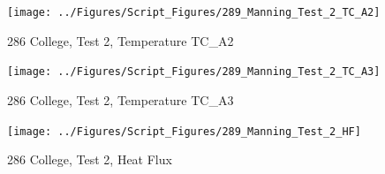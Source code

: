 \documentclass[12pt,oneside]{book}
\begin{document}
\begin{figure}[!ht]
\texttt{[image: ../Figures/Script\_Figures/289\_Manning\_Test\_2\_TC\_A2]}
\caption{286 College, Test 2, Temperature TC\_A2}
\label{fig:289_Manning_Test_2_TC_A2}
\end{figure}

\begin{figure}[!ht]
\texttt{[image: ../Figures/Script\_Figures/289\_Manning\_Test\_2\_TC\_A3]}
\caption{286 College, Test 2, Temperature TC\_A3}
\label{fig:289_Manning_Test_2_TC_A3}
\end{figure}

\begin{figure}[!ht]
\texttt{[image: ../Figures/Script\_Figures/289\_Manning\_Test\_2\_HF]}
\caption{286 College, Test 2, Heat Flux}
\label{fig:289_Manning_Test_2_HF}
\end{figure}
\end{document}
